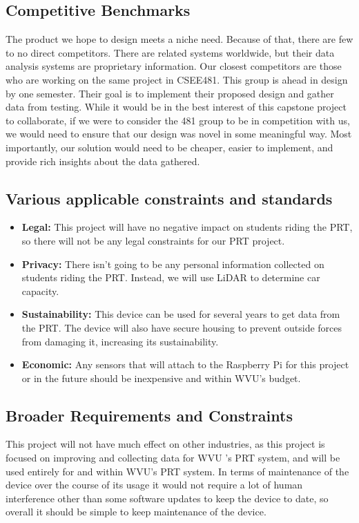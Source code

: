 \subsection{Competitive Benchmarks}
The product we hope to design meets a niche need. Because of that, there are few to no direct competitors. There are related systems worldwide, but their data analysis systems are proprietary information. Our closest competitors are those who are working on the same project in CSEE481. This group is ahead in design by one semester. Their goal is to implement their proposed design and gather data from testing. While it would be in the best interest of this capstone project to collaborate, if we were to consider the 481 group to be in competition with us, we would need to ensure that our design was novel in some meaningful way. Most importantly, our solution would need to be cheaper, easier to implement, and provide rich insights about the data gathered.

\subsection{Various applicable constraints and standards}
\begin{itemize}
    \item \textbf{Legal:} This project will have no negative impact on students riding the PRT, so there will not be any legal constraints for our PRT project.
    \item \textbf{Privacy:} There isn't going to be any personal information collected on students riding the PRT. Instead, we will use LiDAR to determine car capacity.
    \item \textbf{Sustainability:} This device can be used for several years to get data from the PRT. The device will also have secure housing to prevent outside forces from damaging it, increasing its sustainability.
    \item \textbf{Economic:} Any sensors that will attach to the Raspberry Pi for this project or in the future should be inexpensive and within WVU’s budget.
\end{itemize}

\subsection{Broader Requirements and Constraints}
This project will not have much effect on other industries, as this project is focused on improving and collecting data for WVU 's PRT system, and will be used entirely for and within WVU’s PRT system. In terms of maintenance of the device over the course of its usage it would not require a lot of human interference other than some software updates to keep the device to date, so overall it should be simple to keep maintenance of the device.